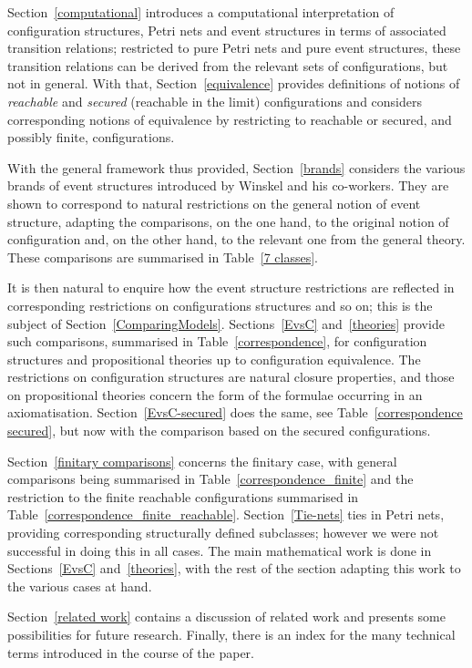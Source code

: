 \documentclass[twocolumn]{article}
\begin{document}
Section~\ref{computational} introduces a computational interpretation
of configuration structures, Petri nets and event structures in terms
of associated transition relations;
restricted to pure Petri nets and pure event structures, these
transition relations can be derived from the relevant sets of
configurations, but not in general.  With that,
Section~\ref{equivalence} provides definitions of notions
of \emph{reachable} and \emph{secured}
(reachable in the limit) configurations and considers corresponding
notions of equivalence by restricting to reachable or secured, and
possibly finite, configurations.

With the general framework thus provided, Section~\ref{brands} considers
the various brands of event structures introduced by Winskel and his
co-workers. They are shown to correspond to natural restrictions on
the general notion of event structure, adapting the comparisons, on the
one hand, to the original notion of configuration and, on the other
hand, to the relevant one from the general theory. These comparisons
are summarised in Table~\ref{7 classes}.

It is then natural to enquire how the event structure restrictions are
reflected in corresponding restrictions on configurations structures
and so on; this is the subject of Section~\ref{ComparingModels}.
Sections~\ref{EvsC} and~\ref{theories} provide such comparisons,
summarised in Table~\ref{correspondence}, for configuration structures
and propositional theories up to configuration equivalence.  The
restrictions on configuration structures are natural closure
properties, and those on propositional theories concern the form of
the formulae occurring in an axiomatisation. Section~\ref{EvsC-secured}
does the same, see Table~\ref{correspondence secured}, but now with
the comparison based on the secured configurations.

Section~\ref{finitary comparisons} concerns the finitary case, with
general comparisons being summarised in Table~\ref{correspondence_finite}
and the restriction to the finite reachable configurations summarised in
Table~\ref{correspondence_finite_reachable}. Section~\ref{Tie-nets}
ties in Petri nets, providing corresponding structurally defined
subclasses; however we were not successful in doing this in all cases. The
main mathematical work is done in Sections~\ref{EvsC} and~\ref{theories},
with the rest of the section adapting this work to the various cases at hand.

Section~\ref{related work} contains a discussion of related work and
presents some possibilities for future research. Finally, there is an
index for the many technical terms introduced in the course of the paper.
\end{document}
